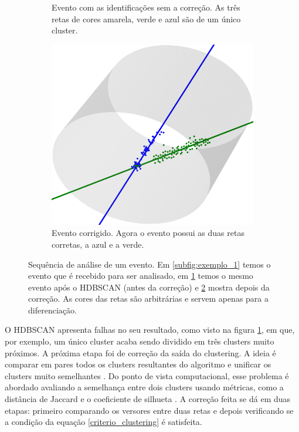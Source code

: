 \documentclass[a4paper,12pt,oneside]{book}
\begin{document}
\begin{figure}[H]
\begin{subfigure}[t]{0.45\textwidth}
        \caption{Evento com as identificações sem a correção. As três retas de cores amarela, verde e azul são de um único cluster.}
        \label{subfig:antes_clustering}
    \end{subfigure}%
    \hspace{0.5cm}
    \begin{subfigure}[t]{0.45\textwidth}
        \centering
        \includegraphics[scale=0.25, width=.95\columnwidth]{figs/clustering_ex_3.png}
        \caption{Evento corrigido. Agora o evento possui as duas retas corretas, a azul e a verde.}
        \label{subfig:depois_clustering}
    \end{subfigure}
\caption{Sequência de análise de um evento. Em \ref{subfig:exemplo_1} temos o evento que é recebido para ser analisado, em \ref{subfig:antes_clustering} temos o mesmo evento após o HDBSCAN (antes da correção) e \ref{subfig:depois_clustering} mostra depois da correção. As cores das retas são arbitrárias e servem apenas para a diferenciação.}
\label{fig:3d_examples}
\end{figure}

\par O HDBSCAN apresenta falhas no seu resultado, como visto na figura \ref{subfig:antes_clustering}, em que, por exemplo, um único cluster acaba sendo dividido em três clusters muito próximos. A próxima etapa foi de correção da saída do clustering. A ideia é comparar em pares todos os clusters resultantes do algoritmo e unificar os clusters muito semelhantes \cite{artigo}. Do ponto de vista computacional, esse problema é abordado avaliando a semelhança entre dois clusters usando métricas, como a distância de Jaccard \cite{jaccard_distance} e o coeficiente de silhueta \cite{silhueta}. A correção feita se dá em duas etapas: primeiro comparando os versores entre duas retas e depois verificando se a condição da equação \ref{criterio_clustering} é satisfeita.
\end{document}
